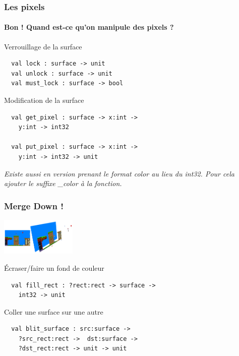 \begin{frame}[fragile]
	\frametitle{Les pixels}
	\framesubtitle{\og{}Bon ! Quand est-ce qu'on manipule des pixels ?\fg}
	\begin{block}{Verrouillage de la surface}
		\begin{lstlisting}
  val lock : surface -> unit
  val unlock : surface -> unit
  val must_lock : surface -> bool
		\end{lstlisting}
	\end{block}
	\begin{block}{Modification de la surface}
		\begin{lstlisting}
  val get_pixel : surface -> x:int -> 
    y:int -> int32

  val put_pixel : surface -> x:int -> 
    y:int -> int32 -> unit
		\end{lstlisting}
		\textit{Existe aussi en version prenant le format color au lieu du int32. Pour cela ajouter le suffixe \_color à la fonction.}
	\end{block}
\end{frame}

\begin{frame}[fragile]
	\frametitle{\og{}Merge Down !\fg}
	\begin{center}
		\includegraphics[width=3.6cm]{pics/surfacesMerge.png}
	\end{center}
	\begin{block}{Écraser/faire un fond de couleur}
		\begin{lstlisting}
  val fill_rect : ?rect:rect -> surface -> 
    int32 -> unit
		\end{lstlisting}
	\end{block}
	\begin{block}{Coller une surface sur une autre}
		\begin{lstlisting}
  val blit_surface : src:surface -> 
    ?src_rect:rect ->  dst:surface -> 
    ?dst_rect:rect -> unit -> unit
		\end{lstlisting}
	\end{block}
\end{frame}

